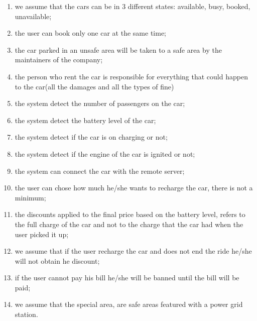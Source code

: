 \begin{enumerate}
	\item we assume that the cars can be in 3 different states: available, busy, booked, unavailable;
	\item the user can book only one car at the same time;
	\item the car parked in an unsafe area will be taken to a safe area by the maintainers of the company;
	\item the person who rent the car is responsible for everything that could happen to the car(all the damages and all the types of fine)
	\item the system detect the number of passengers on the car;
	\item the system detect the battery level of the car;
	\item the system detect if the car is on charging or not;
	\item the system detect if the engine of the car is ignited or not;
	\item the system can connect the car with the remote server;
	\item the user can chose how much he/she wants to recharge the car, there is not a minimum;
	\item the discounts applied to the final price based on the battery level, refers to the full charge of the car and not to the charge that the car had when the user picked it up;
	\item we assume that if the user recharge the car and does not end the ride he/she will not obtain he discount;
	\item if the user cannot pay his bill he/she will be banned until the bill will be paid;
	\item we assume that the special area, are safe areas featured with a power grid station.
\end{enumerate}

